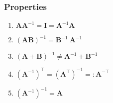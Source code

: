 \subsubsection{Properties}

\begin{multicols}{2}
\begin{enumerate}
    \item $\bm{A}\bm{A}^{-1} = \bm{I} = \bm{A}^{-1}\bm{A}$
    \hfill \cite{mfml/book/mml/Deisenroth-Faisal-Ong}

    \item $(\bm{A}\bm{B})^{-1} = \bm{B}^{-1}\ \bm{A}^{-1}$
    \hfill \cite{mfml/book/mml/Deisenroth-Faisal-Ong}

    \item $(\bm{A} + \bm{B})^{-1} \neq \bm{A}^{-1} + \bm{B}^{-1}$
    \hfill \cite{mfml/book/mml/Deisenroth-Faisal-Ong}

    \item $(\bm{A}^{-1})^\top = (\bm{A}^\top)^{-1} =: \bm{A}^{-\top}$
    \hfill \cite{mfml/book/mml/Deisenroth-Faisal-Ong}

    \item $(\bm{A}^{-1})^{-1} =  \bm{A}$

\end{enumerate}
\end{multicols}

